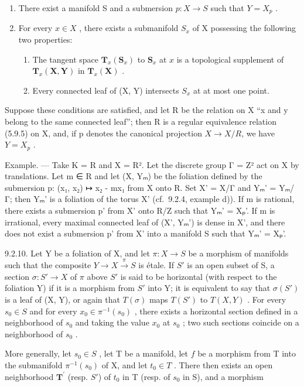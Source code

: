 \begin{enumerate}
\def\labelenumi{\alph{enumi})}
\item
  There exist a manifold S and a submersion \(p: X \to S\) such that \(Y = X_p\) .
\item
  For every \(x \in X\) , there exists a submanifold \(S_{x}\) of X possessing the following two properties:
\begin{enumerate}
\item[\(b_1)\)] The tangent space \(\mathbf{T}_{x}(\mathbf{S}_{x})\) to \(\mathbf{S}_{x}\) at \(x\) is a topological supplement of \(\mathbf{T}_{x}(\mathbf{X},\mathbf{Y})\) in \(\mathbf{T}_{x}(\mathbf{X})\) .
\item[\(b_2)\)] Every connected leaf of (X, Y) intersects \(S_{x}\) at at most one point.
\end{enumerate}
\end{enumerate}

Suppose these conditions are satisfied, and let R be the relation on X “x and y belong to the same connected leaf”; then R is a regular equivalence relation (5.9.5) on X, and, if p denotes the canonical projection \(X \to X/R\), we have \(Y = X_p\) .

Example. --- Take K = R and X = R². Let the discrete group Γ = Z² act on X by translations. Let m ∈ R and let (X, Yₘ) be the foliation defined by the submersion p: (x₁, x₂) ↦ x₂ - mx₁ from X onto R. Set X' = X/Γ and Yₘ' = Yₘ/Γ; then Yₘ' is a foliation of the torus X' (cf.~9.2.4, example d)). If m is rational, there exists a submersion p' from X' onto R/Z such that Yₘ' = Xₚ'. If m is irrational, every maximal connected leaf of (X', Yₘ') is dense in X', and there does not exist a submersion p' from X' into a manifold S such that Yₘ' = Xₚ'.

9.2.10. Let Y be a foliation of X, and let \(\pi: X \to S\) be a morphism of manifolds such that the composite \(Y \to X \xrightarrow{\pi} S\) is étale. If \(S'\) is an open subset of S, a section \(\sigma: S' \to X\) of \(\pi\) above \(S'\) is said to be horizontal (with respect to the foliation Y) if it is a morphism from \(S'\) into Y; it is equivalent to say that \(\sigma(S')\) is a leaf of (X, Y), or again that \(T(\sigma)\) maps \(T(S')\) to \(T(X, Y)\) . For every \(s_0 \in S\) and for every \(x_0 \in \pi^{-1}(s_0)\) , there exists a horizontal section defined in a neighborhood of \(s_0\) and taking the value \(x_0\) at \(s_0\) ; two such sections coincide on a neighborhood of \(s_0\) .

More generally, let \(s_{0}\in S\) , let T be a manifold, let \(f\) be a morphism from T into the submanifold \(\pi^{-1}(s_{0})\) of X, and let \(t_{0}\in T\) . There then exists an open neighborhood \(\mathbf{T}^{\prime}\) (resp. \(S'\)) of \(t_{0}\) in T (resp. of \(s_{0}\) in S), and a morphism

